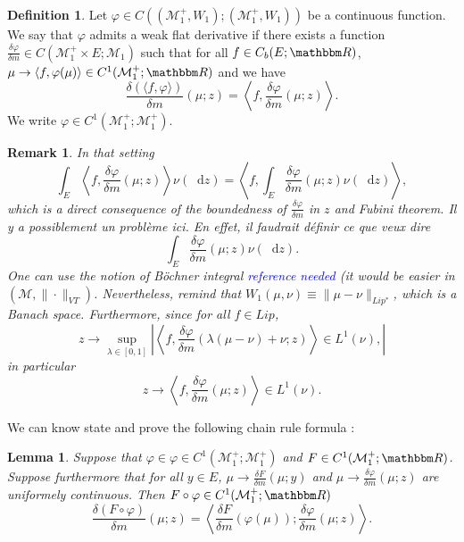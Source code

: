 \documentclass[a4paper,11pt, reqno]{amsart}
\newcommand{\cM}{\mathcal{M}}	\newcommand{\MM}{\mathbbm{M}}
\newcommand{\dd}{\mathop{}\!\mathrm{d}}
\newcommand{\red}[1]{{\color{red} #1}}
\newcommand{\blue}[1]{\textcolor{blue}{#1}}
\newcommand{\1}{\mathbbm{1}}
\theoremstyle{plain}
\newtheorem{lemma}[theorem]{Lemma}
\newtheorem{remark}[theorem]{Remark}
\theoremstyle{definition}
\newtheorem{definition}[theorem]{Definition}
\begin{document}
\begin{definition}
  Let $\varphi \in C ((\cM^+_1, W_1) ; (\cM^+_1, W_1))$ be a
  continuous function. We say that $\varphi$ admits a weak flat derivative if there
  exists a function $\frac{\delta \varphi}{\delta m} \in C (\cM^+_1
  \times E ; \cM_1)$ such that for all $f \in C_b (E ; \RR)$,
  $\mu \rightarrow \langle f, \varphi (\mu) \rangle \in C^1 (\cM^+_1 ;
  \RR)$ and we have
  \[ \frac{\delta (\langle f, \varphi \rangle)}{\delta m} (\mu ; z) =
     \left\langle f, \frac{\delta \varphi}{\delta m} (\mu ; z) \right\rangle .
  \]
  We write $\varphi \in C^1 (\cM_1^+ ; \cM_1^+)$.
\end{definition}

\begin{remark}
  In that setting
  \[ \int_E \left\langle f, \frac{\delta \varphi}{\delta m} (\mu ; z)
     \right\rangle \nu (\dd z) = \left\langle f, \int_E \frac{\delta
     \varphi}{\delta m} (\mu ; z) \nu (\dd z) \right\rangle, \]
  which is a direct consequence of the \red{boundedness} of $\frac{\delta
  \varphi}{\delta m}$ in $z$ and Fubini theorem.
  \red{Il y a possiblement un problème ici. En effet, il faudrait définir ce que veux dire 
  \[\int_{E} \frac{\delta \varphi}{ \delta m}(\mu;z)\nu(\dd z).\]
  One can use the notion of Böchner integral \blue{reference needed} (it would be easier in $(\cM,\|\cdot\|_{VT})$. Nevertheless, remind that $W_1(\mu,\nu) \equiv \|\mu - \nu\|_{Lip^*}$, which is a Banach space. Furthermore, since for all $f\in Lip$,
  \[z\to\sup_{\lambda \in [0,1]}\left|\left\langle f , \frac{\delta \varphi}{\delta m}(\lambda (\mu-\nu) + \nu;z)\right\rangle \in L^1(\nu),\right|\]
  in particular 
  \[z\to \left\langle f , \frac{\delta \varphi}{\delta m}(\mu;z)\right\rangle \in L^1(\nu).\]}
\end{remark}

We can know state and prove the following chain rule formula :

\begin{lemma}
  \label{lemma:chain-rule}Suppose that $\varphi \in \varphi \in C^1
  (\cM_1^+ ; \cM_1^+)$ and $F \in C^1 (\cM^+_1 ;
  \RR)$. Suppose furthermore that for all $y \in E$, $\mu \rightarrow
  \frac{\delta F}{\delta m} (\mu ; y)$ and $\mu \rightarrow \frac{\delta
  \varphi}{\delta m} (\mu ; z)$ are uniformely continuous. Then $F \circ
  \varphi \in C^1 (\cM^+_1 ; \RR)$
  \[ \frac{\delta (F \circ \varphi)}{\delta m} (\mu ; z) = \left\langle
     \frac{\delta F}{\delta m} (\varphi (\mu)) ; \frac{\delta \varphi}{\delta
     m} (\mu ; z) \right\rangle . \]
\end{lemma}
\end{document}
